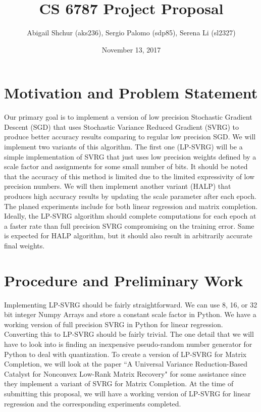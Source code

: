 \documentclass{article}
\title{CS 6787 Project Proposal}
\author{Abigail Shchur (aks236), Sergio Palomo (sdp85), Serena Li (sl2327)}
\date{November 13, 2017}
\begin{document}
\maketitle

\section{Motivation and Problem Statement}

Our primary goal is to implement a version of low precision\cite{Gupta:2015:DLL:3045118.3045303} Stochastic Gradient Descent (SGD) that uses Stochastic Variance Reduced Gradient (SVRG) \cite{Johnson:2013:ASG:2999611.2999647} to produce better accuracy results comparing to regular low precision SGD. We will implement two variants of this algorithm. The first one (LP-SVRG) will be a simple implementation of SVRG that just uses low precision weights defined by a scale factor and assignments for some small number of bits. It should be noted that the accuracy of this method is limited due to the limited expressivity of low precision numbers. We will then implement another variant (HALP)\cite{halp} that produces high accuracy results by updating the scale parameter after each epoch. The planed experiments include for both linear regression and matrix completion. Ideally, the LP-SVRG algorithm should complete computations for each epoch at a faster rate than full precision SVRG compromising on the training error. Same is expected for HALP algorithm, but it should also result in arbitrarily accurate final weights. 

\section{Procedure and Preliminary Work}
Implementing LP-SVRG should be fairly straightforward. We can use 8, 16, or 32 bit integer Numpy Arrays and store a constant scale factor in Python. We have a working version of full precision SVRG in Python for linear regression. Converting this to LP-SVRG should be fairly trivial. The one detail that we will have to look into is finding an inexpensive pseudo-random number generator for Python to deal with quantization. To create a version of LP-SVRG for Matrix Completion, we will look at the paper ``A Universal Variance Reduction-Based Catalyst for Nonconvex Low-Rank Matrix Recovery"\cite{pmlr-v70-wang17n} for some assistance since they implement a variant of SVRG for Matrix Completion. At the time of submitting this proposal, we will have a working version of LP-SVRG for linear regression and the corresponding experiments completed. 
\\
\end{document}
